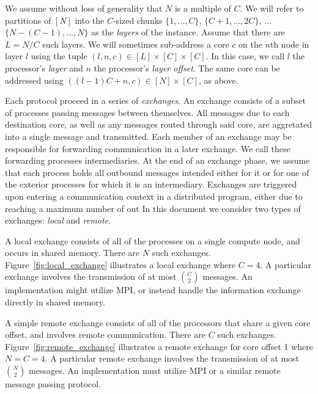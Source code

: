 \documentclass{report}
\begin{document}
We assume without loss of generality that $N$ is a multiple of $C$. 
We will refer to partitions of $[N]$ into the $C$-sized chunks $\{1, \dots, C\}$, $\{C+1, \dots, 2C\}$, $\dots$ $\{N-(C-1), \dots, N\}$ as the \emph{layers} of the instance.
Assume that there are $L = N/C$ such layers.
We will sometimes sub-address a core $c$ on the $n$th node in layer $l$ using the tuple $(l, n, c) \in [L] \times [C] \times [C]$.
In this case, we call $l$ the processor's \emph{layer} and $n$ the processor's \emph{layer offset}. 
The same core can be addressed using $((l-1)C + n, c) \in [N] \times [C]$, as above.

Each protocol proceed in a series of \emph{exchanges}.
An exchange consists of a subset of processes passing messages between themselves.
All messages due to each destination core, as well as any messages routed through said core, are aggretated into a single message and transmitted.
Each member of an exchange may be responsible for forwarding communication in a later exchange.
We call these forwarding processes intermediaries.
At the end of an exchange phase, we assume that each process holds all outbound messages intended either for it or for one of the exterior processes for which it is an intermediary.
Exchanges are triggered upon entering a communication context in a distributed program, either due to reaching a maximum number of out
In this document we consider two types of exchanges: \emph{local} and \emph{remote}.

A local exchange consists of all of the processes on a single compute node, and occurs in shared memory. 
There are $N$ such exchanges.
Figure~\ref{fig:local_exchange} illustrates a local exchange where $C=4$.
A particular exchange involves the transmission of at most ${C \choose 2}$ messages.
An implementation might utilize MPI, or instead handle the information exchange directly in shared memory.

A simple remote exchange consists of all of the processors that share a given core offset, and involves remote communication.
There are $C$ such exchanges.
Figure~\ref{fig:remote_exchange} illustrates a remote exchange for core offset 1 where $N = C = 4$.
A particular remote exchange involves the transmission of at most ${N \choose 2}$ messages.
An implementation must utilize MPI or a similar remote message passing protocol.

\end{document}
